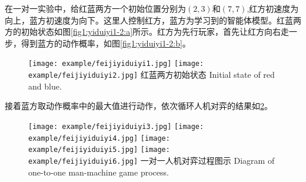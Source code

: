 在一对一实验中，给红蓝两方一个初始位置分别为$(2,3)$和$(7,7)$,红方初速度为向上，蓝方初速度为向下。这里人控制红方，蓝方为学习到的智能体模型。红蓝两方的初始状态如图\ref{fig1:yiduiyi1-2:a}所示。红方为先行玩家，首先让红方向右走一步，得到蓝方的动作概率，如图\ref{fig1:yiduiyi1-2:b}。


\begin{figure}[!h]
	\centering
	\subcaptionbox{\label{fig1:yiduiyi1-2:a}}
	{\texttt{[image: example/feijiyiduiyi1.jpg]}}
	\hspace{0.5em}
	\subcaptionbox{\label{fig1:yiduiyi1-2:b}}
	{\texttt{[image: example/feijiyiduiyi2.jpg]}}
	\bicaption
	{红蓝两方初始状态}
	{Initial state of red and blue.}
	\label{fig1:yiduiyi1-2}
\end{figure}


接着蓝方取动作概率中的最大值进行动作，依次循环人机对弈的结果如\ref{fig2:yiduiyi3-6}。

\begin{figure}[!htp]
	\centering
	\subcaptionbox{\label{fig2:yiduiyi3-6:a}}
	{\texttt{[image: example/feijiyiduiyi3.jpg]}}
	\hspace{0.5em}
	\subcaptionbox{\label{fig2:yiduiyi3-6:b}}
	{\texttt{[image: example/feijiyiduiyi4.jpg]}}
	\newline
	\centering
	\subcaptionbox{\label{fig2:yiduiyi3-6:c}}
	{\texttt{[image: example/feijiyiduiyi5.jpg]}}
	\hspace{0.5em}
	\subcaptionbox{\label{fig2:yiduiyi3-6:d}}
	{\texttt{[image: example/feijiyiduiyi6.jpg]}}
	\bicaption
	{一对一人机对弈过程图示}
	{Diagram of one-to-one man-machine game process.}
	\label{fig2:yiduiyi3-6}
\end{figure}

